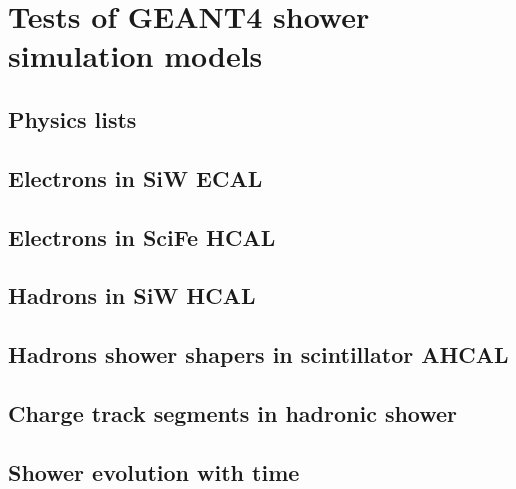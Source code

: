 \chapter{Tests of GEANT4 shower simulation models}

\section{Physics lists}
\section{Electrons in SiW ECAL}
\section{Electrons in SciFe HCAL}
\section{Hadrons in SiW HCAL}
\section{Hadrons shower shapers in scintillator AHCAL}
\section{Charge track segments in hadronic shower}
\section{Shower evolution with time}

